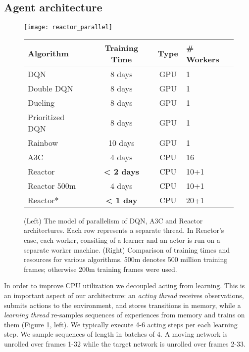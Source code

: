 \documentclass{article}
\begin{document}
\subsection{Agent architecture}\label{sec:agent_arch}
\begin{figure}[t]
\centering
\vspace{0pt}
\begin{minipage}{.35\textwidth}
\hspace{-20px}  \texttt{[image: reactor\_parallel]}\end{minipage}
\begin{minipage}{.01\textwidth}
\hspace{2px}
\end{minipage}
\vspace{0pt}
\begin{minipage}{.55\textwidth}
\begin{tabular}{| l | c | c | l |}
\hline
Algorithm & Training Time & Type & \# Workers \\
\hline
\hline
\cellcolor{dqn_color} DQN & 8 days & GPU & 1  \\
\cellcolor{dqn_color}  Double DQN & 8 days & GPU & 1  \\
\cellcolor{dqn_color} Dueling & 8 days & GPU & 1  \\
\cellcolor{dqn_color} Prioritized DQN & 8 days & GPU & 1  \\
\cellcolor{dqn_color} Rainbow & 10 days & GPU & 1  \\
\cellcolor{ac_color} A3C & 4 days & CPU & 16 \\
\cellcolor{reactor_color} Reactor & {\bf < 2 days} & CPU & 10+1 \\
\cellcolor{reactor_color} Reactor 500m & 4 days & CPU & 10+1 \\
\cellcolor{reactor_color} Reactor* & {\bf < 1 day} & CPU & 20+1 \\
\hline
\end{tabular}
\end{minipage}\caption{\small (Left) The model of parallelism of DQN, A3C and Reactor 
    architectures. Each row represents a separate thread. In Reactor's case,
    each worker, consiting of a learner and an actor is run on a separate 
    worker machine. (Right) Comparison of training times and resources for 
    various algorithms. 500m denotes 500 million training frames; otherwise 
    200m training frames were used.}
  \label{parallelism}
\end{figure}

In order to improve CPU utilization we decoupled acting from learning. 
This is an important aspect of our architecture: an {\em acting thread} 
receives observations, submits actions to the environment, and stores 
transitions in memory, while a {\em learning thread} re-samples 
sequences of experiences from memory and trains on them (Figure 
\ref{parallelism}, left). We typically execute 4-6 acting steps per each 
learning step. We sample sequences of length  in batches of 4. A moving 
network is unrolled over frames 1-32 while the target network is unrolled over 
frames 2-33.
\end{document}
